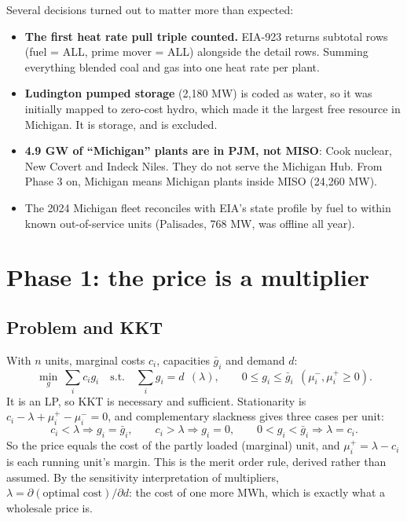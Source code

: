 \documentclass[11pt]{article}
\begin{document}
Several decisions turned out to matter more than expected:
\begin{itemize}
\item \textbf{The first heat rate pull triple counted.} EIA-923 returns subtotal rows (fuel = ALL, prime mover = ALL) alongside the detail rows. Summing everything blended coal and gas into one heat rate per plant.
\item \textbf{Ludington pumped storage} (2{,}180 MW) is coded as water, so it was initially mapped to zero-cost hydro, which made it the largest free resource in Michigan. It is storage, and is excluded.
\item \textbf{4.9 GW of ``Michigan'' plants are in PJM, not MISO}: Cook nuclear, New Covert and Indeck Niles. They do not serve the Michigan Hub. From Phase 3 on, Michigan means Michigan plants inside MISO (24{,}260 MW).
\item The 2024 Michigan fleet reconciles with EIA's state profile by fuel to within known out-of-service units (Palisades, 768 MW, was offline all year).
\end{itemize}

\section{Phase 1: the price is a multiplier}

\subsection{Problem and KKT}
With $n$ units, marginal costs $c_i$, capacities $\bar g_i$ and demand $d$:
\begin{equation}
\min_{g}\ \sum_i c_i g_i \quad \text{s.t.}\quad \sum_i g_i = d \ \ (\lambda), \qquad 0 \le g_i \le \bar g_i \ \ (\mu_i^-, \mu_i^+ \ge 0).
\end{equation}
It is an LP, so KKT is necessary and sufficient. Stationarity is $c_i - \lambda + \mu_i^+ - \mu_i^- = 0$, and complementary slackness gives three cases per unit:
\[
c_i < \lambda \Rightarrow g_i = \bar g_i, \qquad c_i > \lambda \Rightarrow g_i = 0, \qquad 0 < g_i < \bar g_i \Rightarrow \lambda = c_i.
\]
So the price equals the cost of the partly loaded (marginal) unit, and $\mu_i^+ = \lambda - c_i$ is each running unit's margin. This is the merit order rule, derived rather than assumed. By the sensitivity interpretation of multipliers, $\lambda = \partial(\text{optimal cost})/\partial d$: the cost of one more MWh, which is exactly what a wholesale price is.
\end{document}
